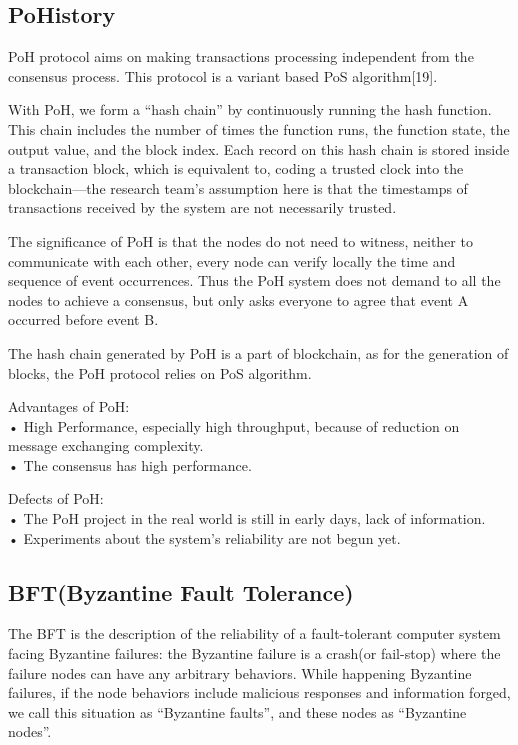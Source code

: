 \documentclass[doublespacing]{bmcart}
\begin{document}
\begin{CJK*}{UTF8}{gbsn}
	\subsection{PoHistory}
	 
	PoH protocol aims on making transactions processing independent from the consensus process. This protocol is a variant based PoS algorithm[19].
	 
	With PoH, we form a ``hash chain'' by continuously running the hash function. This chain includes the number of times the function runs, the function state, the output value, and the block index. Each record on this hash chain is stored inside a transaction block, which is equivalent to, coding a trusted clock into the blockchain—the research team's assumption here is that the timestamps of transactions received by the system are not necessarily trusted.
	 
	The significance of PoH is that  the nodes do not need to witness, neither to communicate with each other, every node can verify locally the time and sequence of event occurrences. Thus the PoH system does not demand to all the nodes to achieve a consensus, but only asks everyone to agree that event A occurred before event B.
	 
	The hash chain generated by PoH is a part of blockchain, as for the generation of blocks, the PoH protocol relies on PoS algorithm.
	
	 
Advantages of PoH:
\\• High Performance, especially high throughput, because of reduction on message exchanging complexity.
\\• The consensus has high performance.
	 
Defects of PoH:
\\• The PoH project in the real world is still in early days, lack of information.
\\• Experiments about the system's reliability are not begun yet. 
	
	\subsection{BFT(Byzantine Fault Tolerance)}
	 
	The BFT is the description of the reliability of a fault-tolerant computer system facing Byzantine failures: the Byzantine failure is a crash(or fail-stop) where the failure nodes can have any arbitrary behaviors.
	While happening Byzantine failures, if the node behaviors include malicious responses and information forged, we call this situation as ``Byzantine faults'', and these nodes as ``Byzantine nodes''.
	

\end{CJK*}
\end{document}
